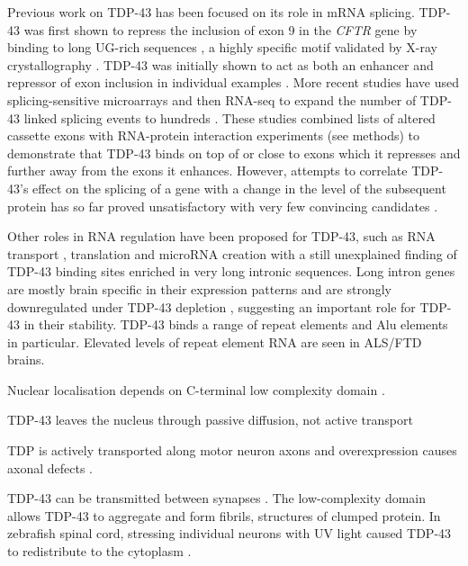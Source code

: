 Previous work on TDP-43 has been focused on its role in mRNA splicing. TDP-43 was first shown to repress the inclusion of exon 9 in the \emph{CFTR} gene by binding to long UG-rich sequences \citep{Buratti2001a, Buratti2001}, a highly specific motif validated by X-ray crystallography \citep{Lukavsky2013}. 
TDP-43 was initially shown to act as both an enhancer and repressor of exon inclusion in individual examples \citep{Mercado2005-js,Bose2008-du,Shiga2012-it}. 
More recent studies have used splicing-sensitive microarrays and then RNA-seq to expand the number of TDP-43 linked splicing events to hundreds  \citep{Polymenidou2011,Tollervey2011,Kapeli2016}. 
These studies combined lists of altered cassette exons with RNA-protein interaction experiments (see methods) to demonstrate that TDP-43 binds on top of or close to exons which it represses and further away from the exons it enhances. 
However, attempts to correlate TDP-43's effect on the splicing of a gene with a change in the level of the subsequent protein has so far proved unsatisfactory with very few convincing candidates \citep{DeConti2015,Stalekar2015}.

Other roles in RNA regulation have been proposed for TDP-43, such as RNA transport \citep{Alami2013}, translation \citep{Freibaum2010-hw} and microRNA creation \citep{Kawahara2012} with a still unexplained finding of TDP-43 binding sites enriched in very long intronic sequences. 
Long intron genes are mostly brain specific in their expression patterns \citep{Sibley2015} and are strongly downregulated under TDP-43 depletion \citep{Polymenidou2011}, suggesting an important role for TDP-43 in their stability.  
TDP-43 binds a range of repeat elements \citep{Li2012,Zarnack2013,Kelley2014} and Alu elements in particular. Elevated levels of repeat element RNA are seen in ALS/FTD brains. %



Nuclear localisation depends on C-terminal low complexity domain \citep{Ayala2008}.

TDP-43 leaves the nucleus through passive diffusion, not active transport \citep{Ederle2018,Pinarbasi2018}

TDP is actively transported along motor neuron axons and overexpression causes axonal defects \citep{Fallini2012}.

TDP-43 can be transmitted between synapses \cite{Feiler2015}.
 The low-complexity domain allows TDP-43 to aggregate and form fibrils, structures of clumped protein. 
In zebrafish spinal cord, stressing individual neurons with UV light caused TDP-43 to redistribute to the cytoplasm \citep{Svahn2018}.


